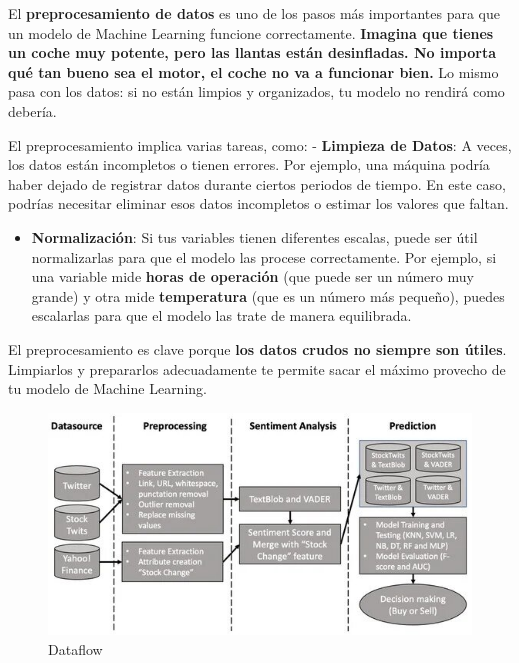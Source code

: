 \documentclass[
  10pt,
  letterpaper,
]{book}
\providecommand{\tightlist}{%
  \setlength{\itemsep}{0pt}\setlength{\parskip}{0pt}}\usepackage{longtable,booktabs,array}
\begin{document}
El \textbf{preprocesamiento de datos} es uno de los pasos más
importantes para que un modelo de Machine Learning funcione
correctamente. \textbf{Imagina que tienes un coche muy potente, pero las
llantas están desinfladas. No importa qué tan bueno sea el motor, el
coche no va a funcionar bien.} Lo mismo pasa con los datos: si no están
limpios y organizados, tu modelo no rendirá como debería.

El preprocesamiento implica varias tareas, como: - \textbf{Limpieza de
Datos}: A veces, los datos están incompletos o tienen errores. Por
ejemplo, una máquina podría haber dejado de registrar datos durante
ciertos periodos de tiempo. En este caso, podrías necesitar eliminar
esos datos incompletos o estimar los valores que faltan.

\begin{itemize}
\tightlist
\item
  \textbf{Normalización}: Si tus variables tienen diferentes escalas,
  puede ser útil normalizarlas para que el modelo las procese
  correctamente. Por ejemplo, si una variable mide \textbf{horas de
  operación} (que puede ser un número muy grande) y otra mide
  \textbf{temperatura} (que es un número más pequeño), puedes escalarlas
  para que el modelo las trate de manera equilibrada.
\end{itemize}

El preprocesamiento es clave porque \textbf{los datos crudos no siempre
son útiles}. Limpiarlos y prepararlos adecuadamente te permite sacar el
máximo provecho de tu modelo de Machine Learning.

\begin{figure}[H]

{\centering \includegraphics{Img/datasource.jpg}

}

\caption{Dataflow}

\end{figure}%
\end{document}
